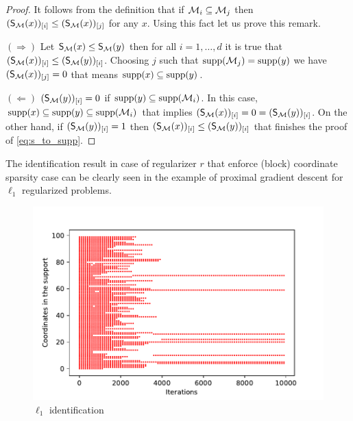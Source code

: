 \begin{example}
\begin{proof}
    It follows from the definition that if $\M_i\subseteq \M_j$ then $(\S(x))_{[i]}\leq(\S(x))_{[j]}$ for any $x$. Using this fact let us prove this remark.
    
    $(\Rightarrow)$ Let  $\S(x)\leq\S(y)$ then for all $i = 1,\dots,d$ it is true that $(\S(x))_{[i]}\leq(\S(y))_{[i]}$. Choosing $j$ such that $\supp(\M_j) = \supp(y)$ we have $(\S(x))_{[j]}= 0$ that means $\supp(x)\subseteq\supp(y)$.
    
    $(\Leftarrow)$ $(\S(y))_{[i]} = 0$ if $\supp(y)\subseteq\supp(\M_i)$. In this case, $\supp(x)\subseteq\supp(y)\subseteq\supp(\M_i)$ that implies $(\S(x))_{[i]} = 0 = (\S(y))_{[i]}$. On the other hand, if $(\S(y))_{[i]} = 1$ then $(\S(x))_{[i]}\leq(\S(y))_{[i]}$ that finishes the proof of \eqref{eq:s_to_supp}.
    \end{proof}
\end{example}

The identification result in case of regularizer $r$ that enforce (block) coordinate sparsity case can be clearly seen in the example of proximal gradient descent for $\ell_1$ regularized problems.


\begin{figure}[h]
\centering

\includegraphics{basics_2/l1_supp.pdf}
\caption{$\ell_1$ identification}
\label{fig:l1supp}
\end{figure}

% 


